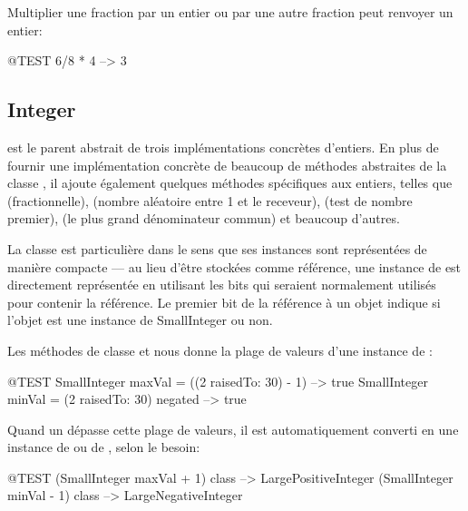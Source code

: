\documentclass[a4paper,10pt,twoside]{book}
\begin{document}
Multiplier une fraction par un entier ou par une autre fraction peut renvoyer un entier:

\begin{code}{@TEST}
6/8 * 4 --> 3
\end{code}


\subsection{Integer}

 est le parent abstrait de trois impl\'ementations
concr\`etes d'entiers. En plus de fournir une impl\'ementation
concr\`ete de beaucoup de m\'ethodes abstraites de la classe
, il ajoute \'egalement quelques m\'ethodes sp\'ecifiques
aux entiers, telles que 
(fractionnelle),
(nombre al\'eatoire entre 1 et le receveur),
(test de nombre premier), 
(le plus grand d\'enominateur commun)
et beaucoup d'autres.

La classe  est particuli\`ere dans le sens que ses instances sont repr\'esent\'ees de mani\`ere compacte --- au lieu d'\^etre stock\'ees comme r\'ef\'erence, une instance de  est directement repr\'esent\'ee en utilisant les bits qui seraient normalement utilis\'es pour contenir la r\'ef\'erence.  Le premier bit de la r\'ef\'erence \`a un objet indique si l'objet est une instance de SmallInteger ou non.

Les m\'ethodes de classe  et  nous donne la plage de valeurs d'une instance de :

\begin{code}{@TEST}
SmallInteger maxVal = ((2 raisedTo: 30) - 1)      --> true
SmallInteger minVal = (2 raisedTo: 30) negated --> true
\end{code}

Quand un  d\'epasse cette plage de valeurs, il est automatiquement converti en une instance de  ou de , selon le besoin:

\begin{code}{@TEST}
(SmallInteger maxVal + 1) class --> LargePositiveInteger
(SmallInteger minVal - 1) class  --> LargeNegativeInteger
\end{code}
\end{document}
